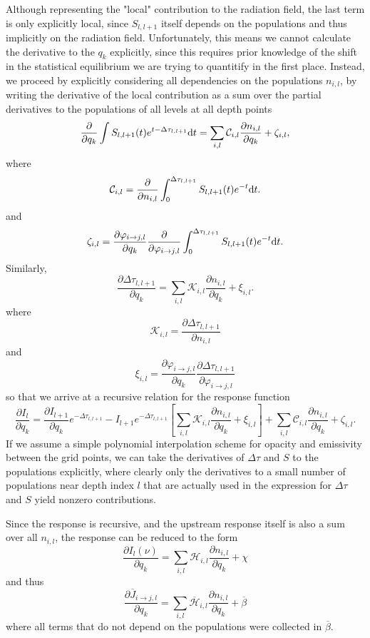 \documentclass[a4paper]{article}
\begin{document}
Although representing the "local" contribution to the radiation field, the last term is only explicitly local, since $S_{l,l+1}$ itself depends on the populations and thus implicitly on the radiation field. Unfortunately, this means we cannot calculate the derivative to the $q_k$ explicitly, since this requires prior knowledge of the shift in the statistical equilibrium we are trying to quantitify in the first place. Instead, we proceed by explicitly considering all dependencies on the populations $n_{i,l}$, by writing the derivative of the local contribution as a sum over the partial derivatives to the populations of all levels at all depth points
$$
\frac{\partial}{\partial q_k} \int  S_{l,l+1}(t) e^{t-\Delta\tau_{l,l+1}} {\rm d}t=\sum_{i,l} {\mathcal C}_{i,l} \frac{\partial n_{i,l}}{\partial q_k}+\zeta_{i,l},
$$
where
$$
{\mathcal C}_{i,l}= \frac{\partial}{\partial n_{i,l}} \int_0^{\Delta\tau_{l,l+1}} S_{l,l+1}(t) e^{-t} {\rm d}t.
$$
and
$$
\zeta_{i,l}=\frac{\partial\varphi_{i\rightarrow j,l}}{\partial q_k}\frac{\partial}{\partial \varphi_{i\rightarrow j,l}} \int_0^{\Delta\tau_{l,l+1}} S_{l,l+1}(t) e^{-t} {\rm d}t.
$$
Similarly,
$$
\frac{\partial \Delta\tau_{l,l+1}}{\partial q_k}=\sum_{i,l} {\mathcal K}_{i,l} \frac{\partial n_{i,l}}{\partial q_k} + \xi_{i,l}.
$$
where
$$
{\mathcal K}_{i,l}=\frac{\partial \Delta\tau_{l,l+1}}{\partial n_{i,l}}
$$
and
$$
\xi_{i,l}=\frac{\partial\varphi_{i\rightarrow j,l}}{\partial q_k}\frac{\partial \Delta\tau_{l,l+1}}{\partial \varphi_{i\rightarrow j,l}}
$$
so that we arrive at a recursive relation for the response function
$$
\frac{\partial I_l}{\partial q_k}= \frac{\partial I_{l+1}}{\partial q_k} e^{-\Delta\tau_{l,l+1}} - I_{l+1} e^{-\Delta\tau_{l,l+1}}\left[ \sum_{i,l} {\mathcal K}_{i,l} \frac{\partial n_{i,l}}{\partial q_k}+ \xi_{i,l}\right]  +\sum_{i,l} {\mathcal C}_{i,l}\frac{\partial n_{i,l}}{\partial q_k}+ \zeta_{i,l}.
$$
If we assume a simple polynomial interpolation scheme for opacity and emissivity between the grid points, we can take the derivatives of $\Delta\tau$ and $S$ to the populations explicitly, where clearly only the derivatives to a small number of populations near depth index $l$ that are actually used in the expression for $\Delta\tau$ and $S$ yield nonzero contributions. 

Since the response is recursive, and the upstream response itself is also a sum over all $n_{i,l}$, the response can be reduced to the form
$$
\frac{\partial I_l(\nu)}{\partial q_k}=\sum_{i,l} {\mathcal H}_{i,l} \frac{\partial n_{i,l}}{\partial q_k}+\chi
$$
and thus
$$
\frac{\partial \overline{J}_{i\rightarrow j,l}}{\partial q_k}=\sum_{i,l} \overline{\mathcal H}_{i,l} \frac{\partial n_{i,l}}{\partial q_k}+\overline{\beta}
$$
where all terms that do not depend on the populations were collected in $\overline{\beta}$.
\end{document}

